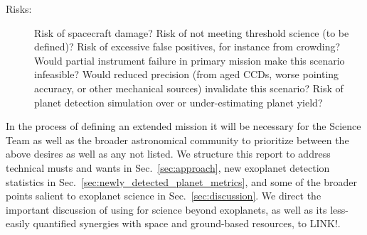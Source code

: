 \begin{description}
	\item[Risks:] 
	Risk of spacecraft damage? 
	Risk of not meeting threshold science (to be defined)? 
	Risk of excessive false positives, for instance from crowding? 
	Would partial instrument failure in primary mission make this scenario infeasible? 
	Would reduced precision (from aged CCDs, worse pointing accuracy, or other mechanical sources) invalidate this scenario? 
	Risk of planet detection simulation over or under-estimating planet yield?
\end{description}

In the process of defining an extended mission it will be necessary for the \tess Science Team as well as the broader astronomical community to prioritize between the above desires as well as any not listed.
We structure this report to address technical musts and wants in Sec.~\ref{sec:approach}, new exoplanet detection statistics in Sec.~\ref{sec:newly_detected_planet_metrics}, and some of the broader points salient to exoplanet science in Sec.~\ref{sec:discussion}.
We direct the important discussion of using \tess for science beyond exoplanets, as well as its less-easily quantified synergies with space and ground-based resources, to LINK!.